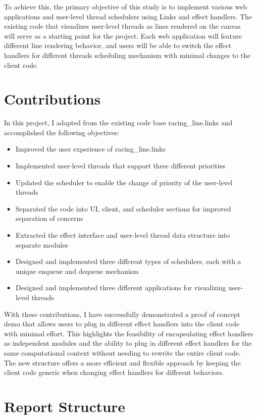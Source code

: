 \documentclass[logo,bsc,singlespacing,parskip]{infthesis}
\begin{document}
To achieve this, the primary objective of this study is to implement various web applications and user-level thread schedulers using Links and effect handlers. The existing code that visualizes user-level threads as lines rendered on the canvas \cite{racinglines} will serve as a starting point for the project. Each web application will feature different line rendering behavior, and users will be able to switch the effect handlers for different threads scheduling mechanism with minimal changes to the client code.

\section{Contributions}
In this project, I adapted from the existing code base racing\_line.links \cite{racinglines} and accomplished the following objectives:

\begin{itemize}
  \item Improved the user experience of racing\_line.links
  \item Implemented user-level threads that support three different priorities
  \item Updated the scheduler to enable the change of priority of the user-level threads
  \item Separated the code into UI, client, and scheduler sections for improved separation of concerns
  \item Extracted the effect interface and user-level thread data structure into separate modules
  \item Designed and implemented three different types of schedulers, each with a unique enqueue and dequeue mechanism
  \item Designed and implemented three different applications for visualizing user-level threads
\end{itemize}

With these contributions, I have successfully demonstrated a proof of concept demo that allows users to plug in different effect handlers into the client code with minimal effort. This highlights the feasibility of encapsulating effect handlers as independent modules and the ability to plug in different effect handlers for the same computational context without needing to rewrite the entire client code. The new structure offers a more efficient and flexible approach by keeping the client code generic when changing effect handlers for different behaviors.

\section{Report Structure}
\end{document}

